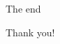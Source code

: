 \documentclass[handout,usenames,dvipsnames]{beamer}
\begin{document}
\begin{frame}{The end}
    \centerline{Thank you!}
\end{frame}



% 
\end{document}
